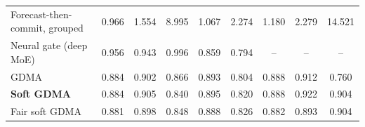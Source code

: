 \begin{tabular}{@{}lcccccccc@{}}
Forecast-then-commit, grouped & 0.966 & 1.554 & 8.995 & 1.067 & 2.274 & 1.180 & 2.279 & 14.521 \\
Neural gate (deep MoE) & 0.956 & 0.943 & 0.996 & 0.859 & 0.794 & -- & -- & -- \\
GDMA & 0.884 & 0.902 & 0.866 & 0.893 & 0.804 & 0.888 & 0.912 & 0.760 \\
\textbf{Soft GDMA} & 0.884 & 0.905 & 0.840 & 0.895 & 0.820 & 0.888 & 0.922 & 0.904 \\
Fair soft GDMA & 0.881 & 0.898 & 0.848 & 0.888 & 0.826 & 0.882 & 0.893 & 0.904 \\
\bottomrule
\end{tabular}